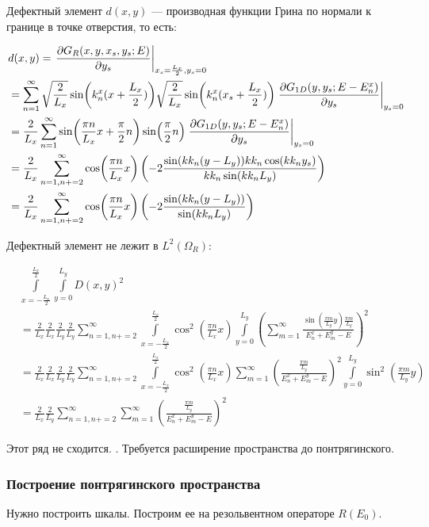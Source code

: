 Дефектный элемент $d(x, y)$ — производная функции Грина по нормали к границе в точке отверстия, то есть:

\begin{align*}
& d(x, y) = \eval{\pdv{G_R(x, y, x_s, y_s; E)}{y_s}}_{x_s = \frac{L_x}{2}, y_s = 0} \\
&= \sum\limits_{n = 1}^\infty
\sqrt{\frac{2}{L_x}} \sin(k_n^x (x + \frac{L_x}{2}))
\sqrt{\frac{2}{L_x}} \sin(k_n^x (x_s + \frac{L_x}{2}))
\eval{\pdv{G_{1D}(y, y_s; E - E^x_n)}{y_s}}_{y_s = 0} \\
&= \frac{2}{L_x} \sum\limits_{n = 1}^\infty
\sin(\frac{\pi n}{L_x} x + \frac{\pi}{2} n)
\sin(\frac{\pi}{2} n)
\eval{\pdv{G_{1D}(y, y_s; E - E^x_n)}{y_s}}_{y_s = 0} \\
&= \frac{2}{L_x} \sum\limits_{n = 1, n += 2}^\infty
\cos(\frac{\pi n}{L_x} x)
\left(-2\frac{\sin(kk_n(y - L_y)) kk_n \cos(kk_n y_s)}{kk_n \sin(kk_n L_y)}\right) \\
&= \frac{2}{L_x} \sum\limits_{n = 1, n += 2}^\infty
\cos(\frac{\pi n}{L_x} x)
\left(-2\frac{\sin(kk_n(y - L_y))}{\sin(kk_n L_y)}\right)
\end{align*}

Дефектный элемент не лежит в $L^2(\Omega_R)$:

\begin{align*}
& \int\limits_{x = -\frac{L_x}{2}}^{\frac{L_x}{2}} \int\limits_{y = 0}^{L_y} D(x, y)^2 \\
& = \frac{2}{L_x} \frac{2}{L_x} \frac{2}{L_y} \frac{2}{L_y}  \sum\limits_{n = 1, n += 2}^\infty
\int\limits_{x = -\frac{L_x}{2}}^{\frac{L_x}{2}} \cos^2(\frac{\pi n}{L_x} x) \int\limits_{y = 0}^{L_y}
\left( \sum\limits_{m = 1}^\infty \frac{\sin(\frac{\pi m}{L_y}y) \frac{\pi m}{L_y}}{E_n^x + E_m^y - E} \right)^2 \\
& = \frac{2}{L_x} \frac{2}{L_x} \frac{2}{L_y} \frac{2}{L_y}  \sum\limits_{n = 1, n += 2}^\infty
\int\limits_{x = -\frac{L_x}{2}}^{\frac{L_x}{2}} \cos^2(\frac{\pi n}{L_x} x)
\sum\limits_{m = 1}^\infty \left( \frac{\frac{\pi m}{L_y}}{E_n^x + E_m^y - E} \right)^2 \int\limits_{y = 0}^{L_y} \sin^2(\frac{\pi m}{L_y}y) \\
& = \frac{2}{L_x} \frac{2}{L_y}  \sum\limits_{n = 1, n += 2}^\infty
\sum\limits_{m = 1}^\infty \left( \frac{\frac{\pi m}{L_y}}{E_n^x + E_m^y - E} \right)^2
\end{align*}

Этот ряд не сходится. . Требуется расширение пространства до понтрягинского.

\subsubsection{Построение понтрягинского пространства}
Нужно построить шкалы. Построим ее на резольвентном операторе $R(E_0)$.

